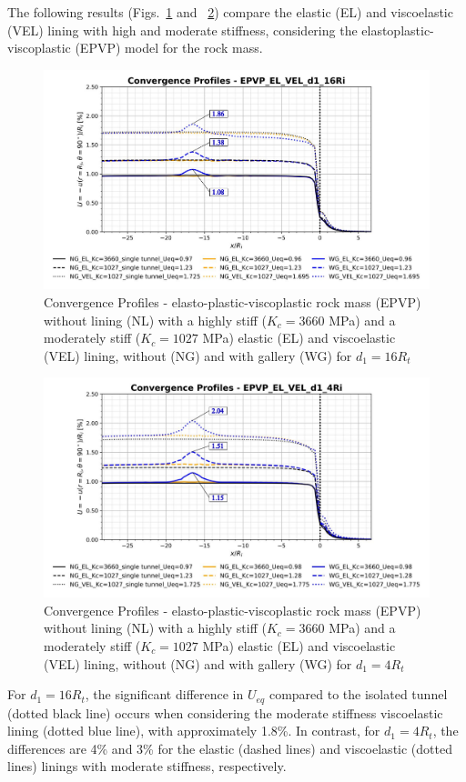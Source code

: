 \documentclass[a4paper,fleqn]{cas-sc}
\begin{document}
The following results (Figs.~\ref{EPVP_EL_VEL_d1_16Ri} and ~\ref{EPVP_EL_VEL_d1_4Ri}) compare the elastic (EL) and viscoelastic (VEL) lining with high and moderate stiffness, considering the elastoplastic-viscoplastic (EPVP) model for the rock mass. 
\begin{figure}[h!]
	\centering
	\includegraphics[scale=0.5]{Convergence Profiles - EPVP_EL_VEL_d1_16Ri.pdf}
	\caption{Convergence Profiles - elasto-plastic-viscoplastic rock mass (EPVP) without lining (NL) with a highly stiff ($K_c = 3660$ MPa) and a moderately stiff ($K_c = 1027$ MPa) elastic (EL) and viscoelastic (VEL) lining, without (NG) and with gallery (WG) for $d_1 = 16R_t$}
	\label{EPVP_EL_VEL_d1_16Ri}
\end{figure}
\FloatBarrier
\begin{figure}[h!]
	\centering
	\includegraphics[scale=0.5]{Convergence Profiles - EPVP_EL_VEL_d1_4Ri.pdf}
	\caption{Convergence Profiles - elasto-plastic-viscoplastic rock mass (EPVP) without lining (NL) with a highly stiff ($K_c = 3660$ MPa) and a moderately stiff ($K_c = 1027$ MPa) elastic (EL) and viscoelastic (VEL) lining, without (NG) and with gallery (WG) for $d_1 = 4R_t$}
	\label{EPVP_EL_VEL_d1_4Ri}
\end{figure}
\FloatBarrier
For $d_1=16R_t$, the significant difference in $U_{eq}$ compared to the isolated tunnel (dotted black line) occurs when considering the moderate stiffness viscoelastic lining (dotted blue line), with approximately 1.8\%. In contrast, for $d_1=4R_t$, the differences are 4\% and 3\% for the elastic (dashed lines) and viscoelastic (dotted lines) linings with moderate stiffness, respectively.
\end{document}
